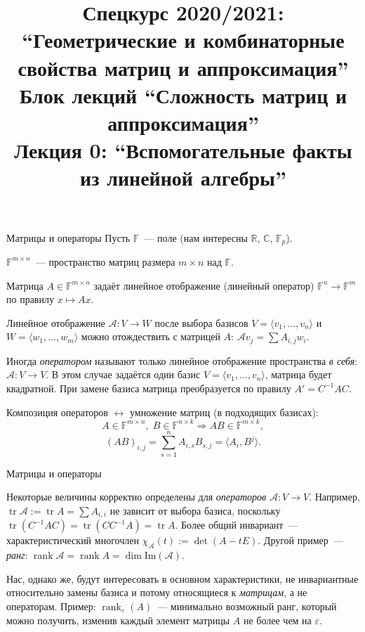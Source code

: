 \documentclass[12pt,handout]{beamer}
\title{Спецкурс 2020/2021: ``Геометрические и комбинаторные свойства матриц и
аппроксимация'' \\ Блок лекций ``Сложность матриц и аппроксимация'' \\ Лекция 0:
``Вспомогательные факты из линейной алгебры''}
\newcommand\R{\mathbb R}
\newcommand\eps{\varepsilon}
\DeclareMathOperator{\rank}{rank}
\DeclareMathOperator{\tr}{tr}
\begin{document}
\maketitle

\begin{frame}{Матрицы и операторы}
    Пусть $\mathbb{F}$~--- поле (нам интересны $\R$, $\mathbb{C}$, $\mathbb F_p$).

    $\mathbb{F}^{m\times n}$~--- пространство матриц размера
    $m\times n$ над $\mathbb F$.

    Матрица $A\in\mathbb{F}^{m\times n}$ задаёт линейное отображение (линейный
    оператор) $\mathbb{F}^n\to\mathbb{F}^m$ по правилу $x\mapsto Ax$.

    Линейное отображение $\mathcal A\colon V\to W$ после выбора базисов
    $V=\langle v_1,\ldots,v_n\rangle$ и $W=\langle w_1,\ldots,w_m\rangle$ можно
    отождествить с матрицей $A$: $\mathcal A v_j = \sum A_{i,j}w_i$.

    Иногда \textit{оператором} называют только линейное отображение
    пространства \textit{в себя}: $\mathcal A\colon V\to V$. В этом случае задаётся один
    базис $V=\langle v_1,\ldots,v_n\rangle$, матрица будет квадратной.
    При замене базиса матрица преобразуется по правилу $A'=C^{-1}AC$.

    Композиция операторов $\leftrightarrow$ умножение матриц (в подходящих
    базисах):
    $$
    A\in\mathbb{F}^{m\times n},\;B\in\mathbb{F}^{n\times k} \Rightarrow
    AB\in\mathbb{F}^{m\times k},
    $$
    $$
    (AB)_{i,j} = \sum_{s=1}^n A_{i,s}B_{s,j} = \langle A_i, B^j\rangle.
    $$
\end{frame}

\begin{frame}{Матрицы и операторы}

    Некоторые величины корректно определены для \textit{операторов} $\mathcal
    A\colon V\to V$. Например, $\tr\mathcal A := \tr A = \sum A_{i,i}$ не зависит
    от выбора базиса, поскольку $\tr(C^{-1}AC) = \tr(CC^{-1}A) = \tr A$.
    Более общий инвариант~--- характеристический многочлен
    $\chi_{\mathcal A}(t) := \det(A-tE)$. Другой пример~--- \textit{ранг}: $\rank\mathcal A =
    \rank A = \dim\mathrm{Im}(\mathcal A)$.

    \pause\vspace{5pt}

    Нас, однако же, будут интересовать в основном характеристики, не инвариантные
    относительно замены базиса и потому относящиеся к \textit{матрицам}, а не
    операторам. Пример: $\rank_{\eps}(A)$~--- минимально возможный ранг, который
    можно получить, изменив каждый элемент матрицы $A$ не более чем на $\eps$.

\end{frame}
\end{document}
